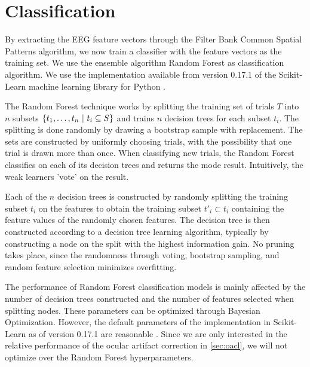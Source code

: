 \section{Classification}\label{sec:randomforest}
By extracting the EEG feature vectors through the Filter Bank Common Spatial Patterns algorithm, we now train a classifier with the feature vectors as the training set.
We use the ensemble algorithm Random Forest as classification algorithm. We use the implementation available from version 0.17.1 of the Scikit-Learn machine learning library for Python \cite{scikit-learn}.

The Random Forest technique works by splitting the training set of trials $T$ into $n$ subsets $\{t_1,\mathellipsis,t_n \ | \ t_i \subseteq S\}$ and trains $n$ decision trees for each subset $t_i$. The splitting is done randomly by drawing a bootstrap sample with replacement. The sets are constructed by uniformly choosing trials, with the possibility that one trial is drawn more than once. When classifying new trials, the Random Forest classifies on each of its decision trees and returns the mode result. Intuitively, the weak learners 'vote' on the result.

Each of the $n$ decision trees is constructed by randomly splitting the training subset $t_i$ on the features to obtain the training subset $t'_i \subset t_i$ containing the feature values of the randomly chosen features. The decision tree is then constructed according to a decision tree learning algorithm, typically by constructing a node on the split with the highest information gain. No pruning takes place, since the randomness through voting, bootstrap sampling, and random feature selection minimizes overfitting.

The performance of Random Forest classification models is mainly affected by the number of decision trees constructed and the number of features selected when splitting nodes. These parameters can be optimized through Bayesian Optimization. However, the default parameters of the implementation in Scikit-Learn \citep{scikit-learn} as of version 0.17.1 are reasonable \citep{bernard2009influence}. Since we are only interested in the relative performance of the ocular artifact correction in \cref{sec:oacl}, we will not optimize over the Random Forest hyperparameters.